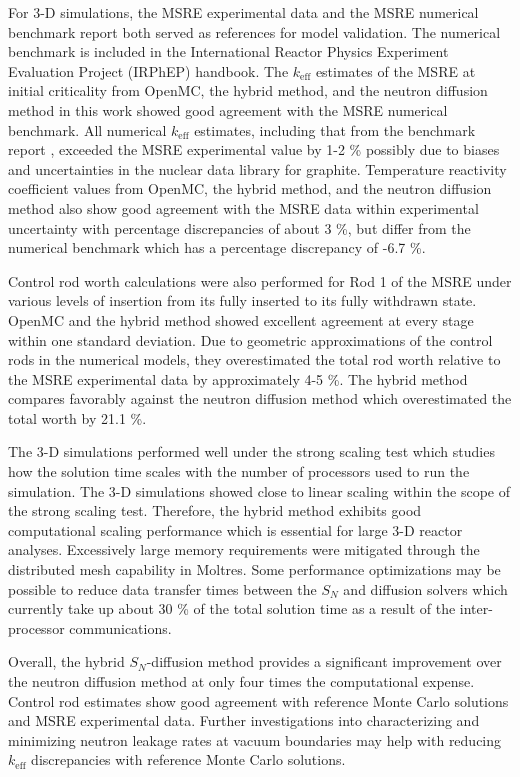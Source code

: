 For 3-D simulations, the \gls{MSRE} experimental data and the \gls{MSRE} numerical benchmark
report \cite{fratoni_molten_2020} both served as references for model validation. The numerical
benchmark is included in the International Reactor Physics Experiment Evaluation Project (IRPhEP)
handbook. The
$k_\text{eff}$ estimates of the \gls{MSRE} at initial criticality from OpenMC, the hybrid method,
and the neutron diffusion method in this work showed good agreement with the \gls{MSRE} numerical
benchmark. All numerical $k_\text{eff}$ estimates, including that from the benchmark report
\cite{fratoni_molten_2020}, exceeded the \gls{MSRE} experimental value by 1-2 \% possibly due to
biases and uncertainties in the nuclear data library for graphite. Temperature reactivity
coefficient values from OpenMC, the hybrid method, and the neutron diffusion method also show good
agreement with the \gls{MSRE} data within experimental uncertainty with percentage discrepancies of
about 3 \%, but differ from the numerical benchmark which has a percentage discrepancy of -6.7 \%.

Control rod worth calculations were also performed for Rod 1 of the \gls{MSRE} under various levels
of insertion from its fully inserted to its fully withdrawn state. OpenMC and the hybrid method
showed excellent agreement at every stage within one standard deviation. Due to geometric
approximations of the control rods in the numerical models, they overestimated the total
rod worth relative to the \gls{MSRE} experimental data by approximately 4-5 \%. The hybrid method
compares favorably against the neutron diffusion method which overestimated the total worth by
21.1 \%.

The 3-D simulations performed well under the strong scaling test which studies how the solution
time scales with the number of processors used to run the simulation. The 3-D simulations showed
close to linear scaling within the scope of the strong scaling test. Therefore, the hybrid method
exhibits good computational scaling performance which is essential for large 3-D reactor analyses.
Excessively large memory requirements were mitigated through the distributed mesh capability in
Moltres. Some performance optimizations may be possible to reduce data transfer times
between the $S_N$ and diffusion solvers which currently take up about 30 \% of the total solution
time as a result of the inter-processor communications.

Overall, the hybrid $S_N$-diffusion method provides a significant improvement over the neutron
diffusion method at only four times the computational expense. Control rod estimates
show good agreement with reference Monte Carlo solutions and \gls{MSRE} experimental data.
Further investigations into characterizing and minimizing neutron leakage rates at vacuum
boundaries may help with reducing $k_\text{eff}$ discrepancies with reference Monte Carlo
solutions.
